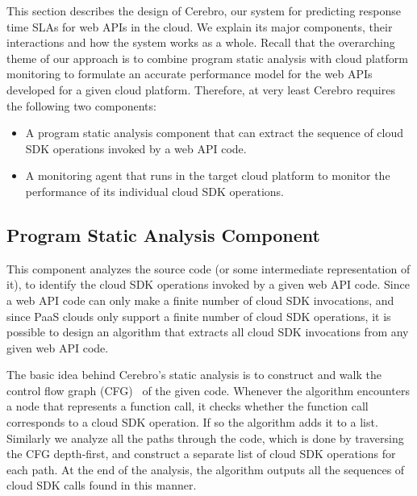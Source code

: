 This section describes the design of Cerebro, our system for predicting response time SLAs for
web APIs in the cloud. We explain its major components, their interactions and how the 
system works as a whole. Recall that the overarching theme of our approach is to combine program
static analysis with cloud platform monitoring to formulate an accurate performance model for the 
web APIs developed for a given cloud platform. Therefore, at very least Cerebro requires the following 
two components:

\begin{itemize}
\item A program static analysis component that can extract the sequence of cloud SDK operations invoked by a web API
code.
\item A monitoring agent that runs in the target cloud platform to monitor the performance of its individual cloud SDK
operations.
\end{itemize}
 
 \subsection{Program Static Analysis Component}
 This component analyzes the source code (or some intermediate representation of it), to identify
 the cloud SDK operations invoked by a given web API code. Since a web API code can only make a finite
 number of cloud SDK invocations, and since PaaS clouds only support a finite number of cloud
 SDK operations, it is possible to design an algorithm that
 extracts all cloud SDK invocations from any given web API code. 

The basic idea behind Cerebro's static analysis is to construct and walk the
 control flow graph (CFG)~\cite{Allen:1970:CFA:800028.808479,Aho:1986:CPT:6448,Morgan:1998:BOC:288765,Muchnick:1998:ACD:286076} of the given code. 
Whenever the 
 algorithm encounters a node that represents a function call,
 it checks whether the function call corresponds to a cloud SDK operation. If so the algorithm
adds it to a list. Similarly we analyze all the paths through the code, which is done
by traversing the CFG depth-first, and construct a separate list of cloud SDK operations
for each path. At the end of the analysis, the algorithm outputs all the sequences of cloud SDK
calls found in this manner.


